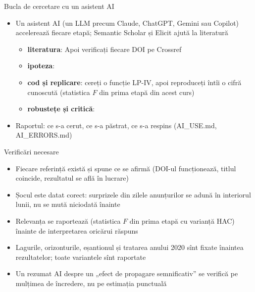 \begin{frame}{Bucla de cercetare cu un asistent AI}
\itemsize{\footnotesize}
\begin{itemize}
    \item Un asistent AI (un LLM precum Claude, ChatGPT, Gemini sau Copilot) accelerează fiecare etapă; Semantic Scholar și Elicit ajută la literatură
    \begin{itemize}
        \item \textbf{literatura}:  Apoi verificați fiecare DOI pe Crossref
        \item \textbf{ipoteza}: 
        \item \textbf{cod și replicare}: cereți o funcție LP-IV, apoi reproduceți întîi o cifră cunoscută (statistica $F$ din prima etapă din acest curs)
        \item \textbf{robustețe și critică}: 
    \end{itemize}
    \item Raportul: ce s-a cerut, ce s-a păstrat, ce s-a respins (AI\_USE.md, AI\_ERRORS.md)
\end{itemize}
\end{frame}

\begin{frame}{Verificări necesare}
\itemsize{\small}
\begin{itemize}
    \item Fiecare referință există și spune ce se afirmă (DOI-ul funcționează, titlul coincide, rezultatul se află în lucrare)
    \item Șocul este datat corect: surprizele din zilele anunțurilor se adună în interiorul lunii, nu se mută niciodată înainte
    \item Relevanța se raportează (statistica $F$ din prima etapă cu varianță HAC) înainte de interpretarea oricărui răspuns
    \item Lagurile, orizonturile, eșantionul și tratarea anului 2020 sînt fixate înaintea rezultatelor; toate variantele sînt raportate
    \item Un rezumat AI despre un „efect de propagare semnificativ” se verifică pe mulțimea de încredere, nu pe estimația punctuală
\end{itemize}
\end{frame}

